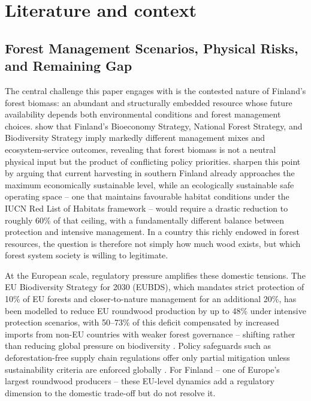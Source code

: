 \documentclass{article}
\begin{document}
\section{Literature and context}
\label{sec:lit_context}

\subsection{Forest Management Scenarios, Physical Risks, and Remaining Gap}

The central challenge this paper engages with is the contested nature of Finland's forest biomass: an abundant and structurally embedded resource whose future availability depends both environmental conditions and forest management choices. \citet{blattertSectoralPoliciesCause2022} show that Finland's Bioeconomy Strategy, National Forest Strategy, and Biodiversity Strategy imply markedly different management mixes and ecosystem-service outcomes, revealing that forest biomass is not a neutral physical input but the product of conflicting policy priorities. \citet{monkkonenEcologicallyEconomicallySustainable2024} sharpen this point by arguing that current harvesting in southern Finland already approaches the maximum economically sustainable level, while an ecologically sustainable safe operating space -- one that maintains favourable habitat conditions under the IUCN Red List of Habitats framework -- would require a drastic reduction to roughly 60\% of that ceiling, with a fundamentally different balance between protection and intensive management. In a country this richly endowed in forest resources, the question is therefore not simply how much wood exists, but which forest system society is willing to legitimate.

At the European scale, regulatory pressure amplifies these domestic tensions. The EU Biodiversity Strategy for 2030 (EUBDS), which mandates strict protection of 10\% of EU forests and closer-to-nature management for an additional 20\%, has been modelled to reduce EU roundwood production by up to 48\% under intensive protection scenarios, with 50--73\% of this deficit compensated by increased imports from non-EU countries with weaker forest governance -- shifting rather than reducing global pressure on biodiversity \citep{fischerLeakageBiodiversityRisks2024,schierAssessmentPossibleProduction2022,kallioPotentialImpactsEUs2025,rosaCanForestManagement2023}. Policy safeguards such as deforestation-free supply chain regulations offer only partial mitigation unless sustainability criteria are enforced globally \citep{fischerLeakageBiodiversityRisks2024,zamaniDeforestationfreeTradeImpact2026}. For Finland -- one of Europe's largest roundwood producers -- these EU-level dynamics add a regulatory dimension to the domestic trade-off but do not resolve it.
\end{document}

